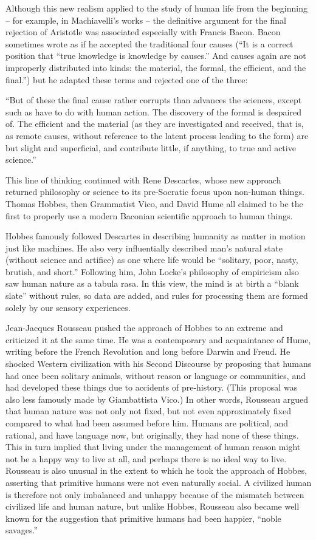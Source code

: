 Although this new realism applied to the study of human life from the beginning – for example, in Machiavelli’s works – the definitive argument for the final rejection of Aristotle was associated especially with Francis Bacon. Bacon sometimes wrote as if he accepted the traditional four causes (``It is a correct position that ``true knowledge is knowledge by causes.'' And causes again are not improperly distributed into kinds: the material, the formal, the efficient, and the final.'') but he adapted these terms and rejected one of the three:

``But of these the final cause rather corrupts than advances the sciences, except such as have to do with human action. The discovery of the formal is despaired of. The efficient and the material (as they are investigated and received, that is, as remote causes, without reference to the latent process leading to the form) are but slight and superficial, and contribute little, if anything, to true and active science.''

This line of thinking continued with Rene Descartes, whose new approach returned philosophy or science to its pre-Socratic focus upon non-human things. Thomas Hobbes, then Grammatist Vico, and David Hume all claimed to be the first to properly use a modern Baconian scientific approach to human things.

Hobbes famously followed Descartes in describing humanity as matter in motion just like machines. He also very influentially described man’s natural state (without science and artifice) as one where life would be “solitary, poor, nasty, brutish, and short.”  Following him, John Locke’s philosophy of empiricism also saw human nature as a tabula rasa. In this view, the mind is at birth a “blank slate” without rules, so data are added, and rules for processing them are formed solely by our sensory experiences.

Jean-Jacques Rousseau pushed the approach of Hobbes to an extreme and criticized it at the same time. He was a contemporary and acquaintance of Hume, writing before the French Revolution and long before Darwin and Freud. He shocked Western civilization with his Second Discourse by proposing that humans had once been solitary animals, without reason or language or communities, and had developed these things due to accidents of pre-history. (This proposal was also less famously made by Giambattista Vico.)  In other words, Rousseau argued that human nature was not only not fixed, but not even approximately fixed compared to what had been assumed before him. Humans are political, and rational, and have language now, but originally, they had none of these things. This in turn implied that living under the management of human reason might not be a happy way to live at all, and perhaps there is no ideal way to live. Rousseau is also unusual in the extent to which he took the approach of Hobbes, asserting that primitive humans were not even naturally social. A civilized human is therefore not only imbalanced and unhappy because of the mismatch between civilized life and human nature, but unlike Hobbes, Rousseau also became well known for the suggestion that primitive humans had been happier, “noble savages.”

